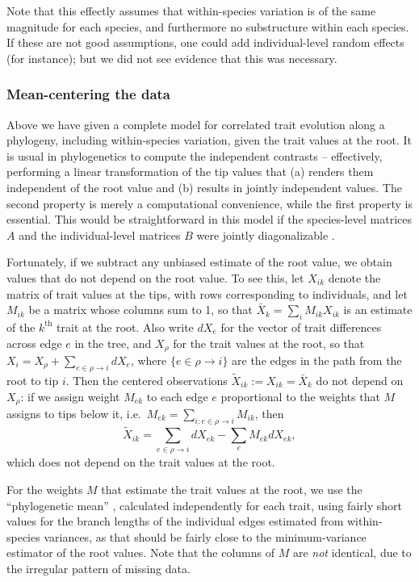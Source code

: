 \documentclass[12pt]{article}
\begin{document}
Note that this effectly assumes that within-species variation is of the same magnitude for each species,
and furthermore no substructure within each species.
If these are not good assumptions, one could add individual-level random effects (for instance);
but we did not see evidence that this was necessary.


\subsubsection*{Mean-centering the data}

Above we have given a complete model for correlated trait evolution along a phylogeny,
including within-species variation,
given the trait values at the root.
It is usual in phylogenetics to compute the independent contrasts -- 
effectively, performing a linear transformation of the tip values that (a) renders them independent of the root value
and (b) results in jointly independent values.
The second property is merely a computational convenience, while the first property is essential.
This would be straightforward in this model if the species-level matrices $A$ and the individual-level matrices $B$ were jointly diagonalizable 
\citep[as in][]{revell2009phylogenetic}.

Fortunately, if we subtract any unbiased estimate of the root value, we obtain values that do not depend on the root value.
To see this, let $X_{ik}$ denote the matrix of trait values at the tips, with rows corresponding to individuals, 
and let $M_{ik}$ be a matrix whose columns sum to 1, so that 
$\bar X_k = \sum_i M_{ik} X_{ik}$ is an estimate of the $k^\mathrm{th}$ trait at the root.
Also write $dX_e$ for the vector of trait differences across edge $e$ in the tree,
and $X_\rho$ for the trait values at the root,
so that $X_i = X_\rho + \sum_{e \in \rho \to i} dX_e$,
where $\{e \in \rho \to i\}$ are the edges in the path from the root to tip $i$.
Then the centered observations $\widetilde X_{ik} := X_{ik} = \bar X_k$ do not depend on $X_\rho$:
if we assign weight $M_{ek}$ to each edge $e$ proportional to the weights that $M$ assigns to tips below it,
i.e.\ $M_{ek} = \sum_{i : e \in \rho \to i} M_{ik}$, then
\begin{equation} \label{eqn:mean_centering}
  \widetilde X_{ik} = \sum_{e \in \rho \to i} dX_{ek} - \sum_e M_{ek} dX_{ek} ,
\end{equation}
which does not depend on the trait values at the root.

For the weights $M$ that estimate the trait values at the root,
we use the ``phylogenetic mean'' \citep{felsenstein1973maximumlikelihood},
calculated independently for each trait,
using fairly short values for the branch lengths of the individual edges estimated from within-species variances,
as that should be fairly close to the minimum-variance estimator of the root values.
Note that the columns of $M$ are \emph{not} identical,
due to the irregular pattern of missing data.
\end{document}
